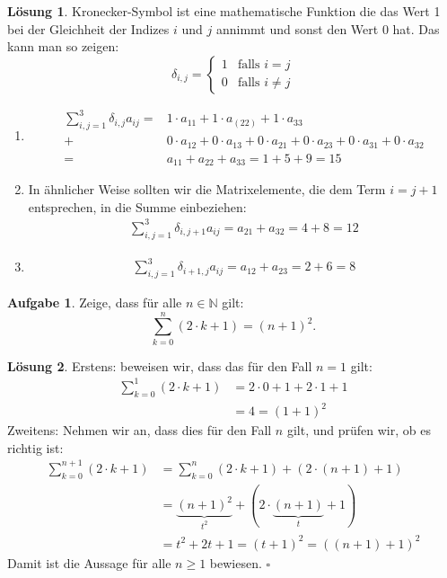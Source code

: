 \documentclass{article}
\theoremstyle{definition}
\newtheorem{ub}{Aufgabe}
\newtheorem*{lo*}{Lösung}
\begin{document}
\begin{tcolorbox}
	\begin{lo*}
		Kronecker-Symbol ist eine mathematische Funktion die das Wert 1 bei der Gleichheit der Indizes $ i $ und $ j $ annimmt und sonst den Wert $ 0 $ hat. Das kann man so zeigen:
		\[ 
		\delta_{i,j} = \left\{
		\begin{array}{ll}
			1 & \text{falls } i = j \\
			0 & \text{falls } i \neq j
		\end{array}
		\right.
		 \]
		\begin{enumerate}
			\item 
			\begin{align*}
				\sum_{i,j = 1}^{3} \delta_{i,j}a_{ij} = & 
				1 \cdot a_{11} + 1 \cdot a_(22) + 1 \cdot a_{33} \\[-3mm]
				+ & 0 \cdot a_{12} + 0 \cdot a_{13} + 0 \cdot a_{21} + 0 \cdot a_{23} +
				0 \cdot a_{31} + 0 \cdot a_{32} \\
				= & a_{11} + a_{22} + a_{33} = 1 + 5+ 9 = 15
			\end{align*}
			\item 
			In ähnlicher Weise sollten wir die Matrixelemente, die dem Term $ i = j+1 $ entsprechen, in die Summe einbeziehen:
			\begin{align*}
				 \sum_{i,j = 1}^{3} \delta_{i,j+1} a_{ij} = a_{21} + a_{32} = 4 + 8 = 12
			\end{align*}
			\item 
			\begin{align*}
				\sum_{i,j = 1}^{3} \delta_{i+1,j} a_{ij} = a_{12} + a_{23} = 2 + 6 = 8
			\end{align*}
		\end{enumerate}
	\end{lo*}
\end{tcolorbox}
\newpage
\begin{ub}
	Zeige, dass für alle $ n  \in \mathbb{N} $ gilt:
	\[ 
	\sum_{k=0}^{n} (2 \cdot k +1) = (n+1)^2.
	 \]
\end{ub}
\begin{tcolorbox}
	\begin{lo*}
		Erstens: beweisen wir, dass das für den Fall $ n = 1 $ gilt:
		\begin{align*}
			\sum_{k=0}^{1} (2 \cdot k + 1) & = 2 \cdot 0 + 1 + 2 \cdot 1 + 1 \\
			& = 4 = (1 + 1)^2
		\end{align*}
		Zweitens: Nehmen wir an, dass dies für den Fall $ n $ gilt, und prüfen wir, ob es richtig ist:
		\begin{align*}
			\sum_{k=0}^{n+1} (2\cdot k +1) & = \sum_{k=0}^{n} (2 \cdot k + 1) + (2 \cdot (n+1) + 1) \\
			& = \underbrace{(n + 1)^2}_{t^2} + (2 \cdot \underbrace{(n+1)}_{t} + 1)  \\
			& = t^2 + 2t + 1 = (t+1)^2 = ((n+1) + 1)^2
		\end{align*}
		Damit ist die Aussage für alle $ n \geq 1 $ bewiesen. \hfill $ \square $
	\end{lo*}
\end{tcolorbox}
\end{document}
